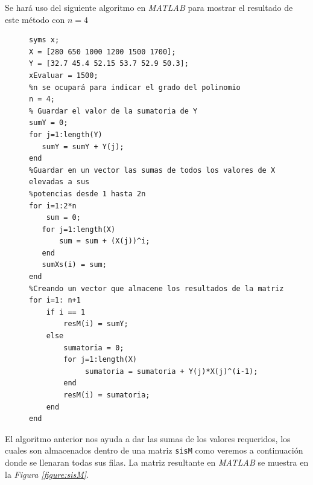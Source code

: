 \documentclass[11pt,letterpaper]{article}
\begin{document}
Se hará uso del siguiente algoritmo en \textit{MATLAB} para mostrar el resultado de este método con $n=4$
\begin{figure}[H]
\begin{tcolorbox}[title=Ejemplo 2: Implementación en MATLAB]
\begin{verbatim}
syms x;
X = [280 650 1000 1200 1500 1700];
Y = [32.7 45.4 52.15 53.7 52.9 50.3];
xEvaluar = 1500;
%n se ocupará para indicar el grado del polinomio
n = 4;
% Guardar el valor de la sumatoria de Y
sumY = 0;
for j=1:length(Y)
   sumY = sumY + Y(j); 
end
%Guardar en un vector las sumas de todos los valores de X elevadas a sus
%potencias desde 1 hasta 2n 
for i=1:2*n
    sum = 0;
   for j=1:length(X)
       sum = sum + (X(j))^i;
   end
   sumXs(i) = sum;
end
%Creando un vector que almacene los resultados de la matriz
for i=1: n+1
    if i == 1
        resM(i) = sumY; 
    else
        sumatoria = 0;
        for j=1:length(X)
             sumatoria = sumatoria + Y(j)*X(j)^(i-1);
        end
        resM(i) = sumatoria;
    end
end
\end{verbatim}
\end{tcolorbox}
\end{figure}
El algoritmo anterior nos ayuda a dar las sumas de los valores requeridos, los cuales son almacenados dentro de una matriz \texttt{sisM} como veremos a continuación donde se llenaran todas sus filas. La matriz resultante en \textit{MATLAB }se muestra en la \textit{Figura \ref{figure:sisM}}.
\end{document}
